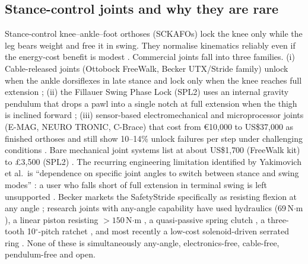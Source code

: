 \documentclass[11pt,a4paper]{article}
\begin{document}
\subsection{Stance-control joints and why they are rare}
Stance-control knee--ankle--foot orthoses (SCKAFOs) lock the knee only while the leg bears weight and free it in swing. They normalise kinematics reliably even if the energy-cost benefit is modest \cite{davis2010,zissimopoulos2007,irby2005,yakimovich2009}. Commercial joints fall into three families. (i) Cable-released joints (Ottobock FreeWalk, Becker UTX/Stride family) unlock when the ankle dorsiflexes in late stance and lock only when the knee reaches full extension \cite{yakimovich2009}; (ii) the Fillauer Swing Phase Lock (SPL2) uses an internal gravity pendulum that drops a pawl into a single notch at full extension when the thigh is inclined forward \cite{spl2_manual}; (iii) sensor-based electromechanical and microprocessor joints (E-MAG, NEURO TRONIC, C-Brace) that cost from \euro10{,}000 to US\$37{,}000 as finished orthoses and still show 10--14\% unlock failures per step under challenging conditions \cite{neurotronic2023,schmalz2016,price_cbrace_sps}. Bare mechanical joint systems list at about US\$1{,}700 (FreeWalk kit) to \pounds3{,}500 (SPL2) \cite{price_freewalk_kit,price_spl2_uk}. The recurring engineering limitation identified by Yakimovich et al.\ is ``dependence on specific joint angles to switch between stance and swing modes'' \cite{yakimovich2009}: a user who falls short of full extension in terminal swing is left unsupported \cite{resna2019_eveleight}. Becker markets the SafetyStride specifically as resisting flexion at any angle \cite{becker_safetystride}; research joints with any-angle capability have used hydraulics (69\,N$\cdot$m \cite{yakimovich2006}), a linear piston resisting $>150$\,N$\cdot$m \cite{lemaire2009}, a quasi-passive spring clutch \cite{shamaei2014}, a three-tooth 10$^\circ$-pitch ratchet \cite{resna2019_eveleight}, and most recently a low-cost solenoid-driven serrated ring \cite{embc2025solenoid}. None of these is simultaneously any-angle, electronics-free, cable-free, pendulum-free and open.
\end{document}
